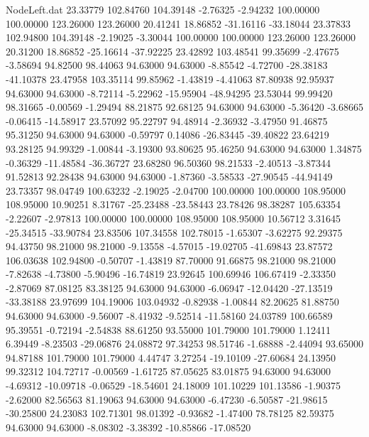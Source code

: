 \begin{filecontents}{NodeLeft.dat}
  23.33779  102.84760  104.39148    -2.76325   -2.94232  100.00000  100.00000  123.26000  123.26000   20.41241   18.86852  -31.16116  -33.18044
  23.37833  102.94800  104.39148    -2.19025   -3.30044  100.00000  100.00000  123.26000  123.26000   20.31200   18.86852  -25.16614  -37.92225
  23.42892  103.48541   99.35699    -2.47675   -3.58694   94.82500   98.44063   94.63000   94.63000   -8.85542   -4.72700  -28.38183  -41.10378
  23.47958  103.35114   99.85962    -1.43819   -4.41063   87.80938   92.95937   94.63000   94.63000   -8.72114   -5.22962  -15.95904  -48.94295
  23.53044   99.99420   98.31665    -0.00569   -1.29494   88.21875   92.68125   94.63000   94.63000   -5.36420   -3.68665   -0.06415  -14.58917
  23.57092   95.22797   94.48914    -2.36932   -3.47950   91.46875   95.31250   94.63000   94.63000   -0.59797    0.14086  -26.83445  -39.40822
  23.64219   93.28125   94.99329    -1.00844   -3.19300   93.80625   95.46250   94.63000   94.63000    1.34875   -0.36329  -11.48584  -36.36727
  23.68280   96.50360   98.21533    -2.40513   -3.87344   91.52813   92.28438   94.63000   94.63000   -1.87360   -3.58533  -27.90545  -44.94149
  23.73357   98.04749  100.63232    -2.19025   -2.04700  100.00000  100.00000  108.95000  108.95000   10.90251    8.31767  -25.23488  -23.58443
  23.78426   98.38287  105.63354    -2.22607   -2.97813  100.00000  100.00000  108.95000  108.95000   10.56712    3.31645  -25.34515  -33.90784
  23.83506  107.34558  102.78015    -1.65307   -3.62275   92.29375   94.43750   98.21000   98.21000   -9.13558   -4.57015  -19.02705  -41.69843
  23.87572  106.03638  102.94800    -0.50707   -1.43819   87.70000   91.66875   98.21000   98.21000   -7.82638   -4.73800   -5.90496  -16.74819
  23.92645  100.69946  106.67419    -2.33350   -2.87069   87.08125   83.38125   94.63000   94.63000   -6.06947  -12.04420  -27.13519  -33.38188
  23.97699  104.19006  103.04932    -0.82938   -1.00844   82.20625   81.88750   94.63000   94.63000   -9.56007   -8.41932   -9.52514  -11.58160
  24.03789  100.66589   95.39551    -0.72194   -2.54838   88.61250   93.55000  101.79000  101.79000    1.12411    6.39449   -8.23503  -29.06876
  24.08872   97.34253   98.51746    -1.68888   -2.44094   93.65000   94.87188  101.79000  101.79000    4.44747    3.27254  -19.10109  -27.60684
  24.13950   99.32312  104.72717    -0.00569   -1.61725   87.05625   83.01875   94.63000   94.63000   -4.69312  -10.09718   -0.06529  -18.54601
  24.18009  101.10229  101.13586    -1.90375   -2.62000   82.56563   81.19063   94.63000   94.63000   -6.47230   -6.50587  -21.98615  -30.25800
  24.23083  102.71301   98.01392    -0.93682   -1.47400   78.78125   82.59375   94.63000   94.63000   -8.08302   -3.38392  -10.85866  -17.08520

\end{filecontents}
